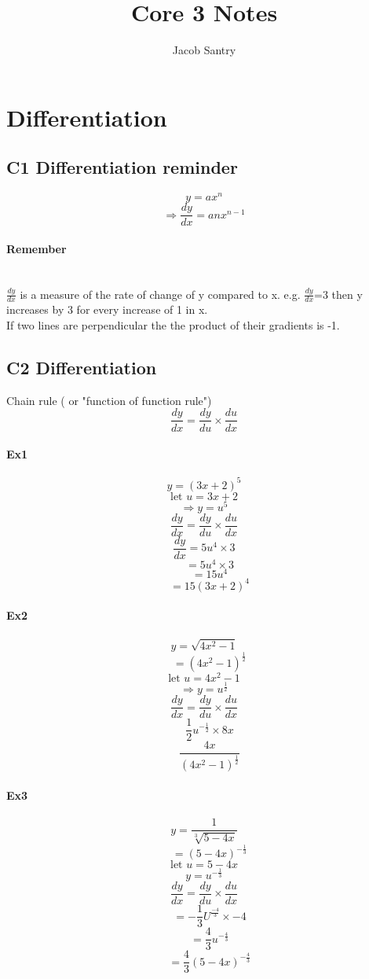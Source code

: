 \documentclass[a4paper]{article}
\title{Core 3 Notes}
\author{Jacob Santry}
\begin{document}
\maketitle
\tableofcontents

\section{Differentiation}
\subsection{C1 Differentiation reminder}

\[y=ax^n\]
\[\Rightarrow \frac{dy}{dx}=anx^{n-1} \]
\paragraph{Remember}\mbox{}\\
$\frac{dy}{dx}$ is a measure of the rate of change of y compared to x. e.g. $\frac{dy}{dx}$=3 then y increases by 3 for every increase of 1 in x.\\
If two lines are perpendicular the the product of their gradients is -1.

\subsection{C2 Differentiation}
Chain rule ( or "function of function rule") \\
\[\frac{dy}{dx}=\frac{dy}{du}\times\frac{du}{dx}\]

\begin{multicols}{3}
\large
\paragraph{Ex1}
\[y=(3x+2)^5\]
\[\text{let }u=3x+2\]
\[\Rightarrow y=u^5 \]
\[\frac{dy}{dx}=\frac{dy}{du}\times\frac{du}{dx}\]
\[\frac{dy}{dx}=5u^4\times3\]
\[\quad = 5u^4 \times 3 \]
\[\quad = 15u^4 \]
\[\quad = 15(3x+2)^4 \]

\paragraph{Ex2}
\[y=\sqrt{4x^2-1}\]
\[\quad = (4x^2-1)^{\frac{1}{2}} \]
\[\text{let }u = 4x^2 -1 \]
\[\Rightarrow y=u^{\frac{1}{2}} \]
\[\frac{dy}{dx}=\frac{dy}{du}\times\frac{du}{dx}\]
\[\quad \frac{1}{2}u^{-\frac{1}{2}}\times 8x \]
\[\quad \frac{4x}{(4x^2-1)^{\frac{1}{2}}} \]

\paragraph{Ex3}
\[y=\frac{1}{\sqrt[3]{5-4x}}\]
\[\quad = (5-4x)^{-\frac{1}{3}} \]
\[\text{let } u = 5-4x \]
\[y=u^{-\frac{1}{3}} \]
\[\frac{dy}{dx}=\frac{dy}{du}\times\frac{du}{dx}\]
\[\quad = -\frac{1}{3}U^{\frac{-4}{3}}\times -4 \]
\[\quad = \frac{4}{3}u^{-\frac{4}{3}} \]
\[\quad = \frac{4}{3}(5-4x)^{-\frac{4}{3}} \]
\normalsize
\end{multicols}
\end{document}
